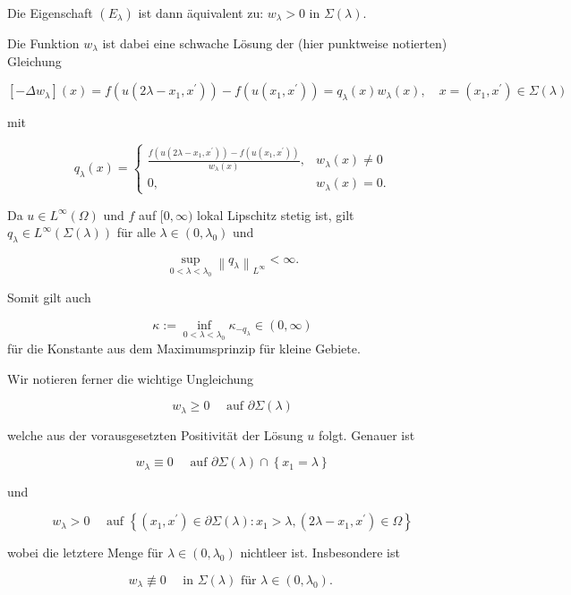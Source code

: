 \documentclass[10pt, letterpaper]{article}
\begin{document}
Die Eigenschaft $\left(E_{\lambda}\right)$ ist dann äquivalent zu: $w_{\lambda}>0$ in $\Sigma(\lambda)$.

Die Funktion $w_{\lambda}$ ist dabei eine schwache Lösung der (hier punktweise notierten) Gleichung

$$
\left[-\Delta w_{\lambda}\right](x)=f\left(u\left(2 \lambda-x_{1}, x^{\prime}\right)\right)-f\left(u\left(x_{1}, x^{\prime}\right)\right)=q_{\lambda}(x) w_{\lambda}(x), \quad x=\left(x_{1}, x^{\prime}\right) \in \Sigma(\lambda)
$$

mit

$$
q_{\lambda}(x)= \begin{cases}\frac{f\left(u\left(2 \lambda-x_{1}, x^{\prime}\right)\right)-f\left(u\left(x_{1}, x^{\prime}\right)\right)}{w_{\lambda}(x)}, & w_{\lambda}(x) \neq 0 \\ 0, & w_{\lambda}(x)=0 .\end{cases}
$$

Da $u \in L^{\infty}(\Omega)$ und $f$ auf $[0, \infty)$ lokal Lipschitz stetig ist, gilt $q_{\lambda} \in L^{\infty}(\Sigma(\lambda))$ für alle $\lambda \in\left(0, \lambda_{0}\right)$ und

$$
\sup _{0<\lambda<\lambda_{0}}\left\|q_{\lambda}\right\|_{L^{\infty}}<\infty .
$$

Somit gilt auch

$$
\kappa:=\inf _{0<\lambda<\lambda_{0}} \kappa_{-q_{\lambda}} \in(0, \infty)
$$
für die Konstante aus dem Maximumsprinzip für kleine Gebiete.

Wir notieren ferner die wichtige Ungleichung

$$
w_{\lambda} \geq 0 \quad \text { auf } \partial \Sigma(\lambda)
$$

welche aus der vorausgesetzten Positivität der Lösung $u$ folgt. Genauer ist

$$
w_{\lambda} \equiv 0 \quad \text { auf } \partial \Sigma(\lambda) \cap\left\{x_{1}=\lambda\right\}
$$

und

$$
w_{\lambda}>0 \quad \text { auf }\left\{\left(x_{1}, x^{\prime}\right) \in \partial \Sigma(\lambda): x_{1}>\lambda,\left(2 \lambda-x_{1}, x^{\prime}\right) \in \Omega\right\}
$$

wobei die letztere Menge für $\lambda \in\left(0, \lambda_{0}\right)$ nichtleer ist. Insbesondere ist

$$
w_{\lambda} \not \equiv 0 \quad \text { in } \Sigma(\lambda) \text { für } \lambda \in\left(0, \lambda_{0}\right) \text {. }
$$
\end{document}
